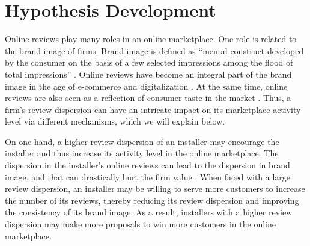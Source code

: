 \documentclass[msom,blindrev]{informs3}
\begin{document}
	
	
\section{Hypothesis Development} \label{Sec: Hypothesis}

	Online reviews play many roles in an online marketplace. One role is related to the brand image of firms. Brand image is defined as ``mental construct developed by the consumer on the basis of a few selected impressions among the flood of total impressions'' \citep{reynolds}. Online reviews have become an integral part of the brand image in the age of e-commerce and digitalization \citep{chakraborty2018credibility,chakraborty2018effects,brandimage}. At the same time, online reviews are also seen as a reflection of consumer taste in the market \citep{clemons2006online}. Thus, a firm's review dispersion can have an intricate impact on its marketplace activity level via different mechanisms, which we will explain below.


	On one hand,  a higher review dispersion of an installer may encourage the installer and thus increase its activity level in the online marketplace.  The dispersion in the installer's online reviews can lead to the dispersion in brand image, and that can drastically hurt the firm value \citep{luo2013impact}. When faced with a large review dispersion, an installer may be willing to serve more customers to increase the number of its reviews, thereby reducing its review dispersion and improving the consistency of its brand image. As a result, installers with a higher review dispersion may make more proposals to win more customers in the online marketplace.


\end{document}
